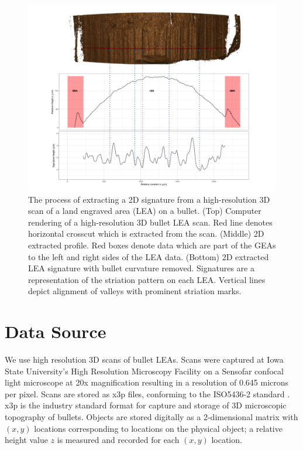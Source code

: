 \documentclass[12pt]{article}
\begin{document}
\begin{figure}
\centering
\includegraphics[width=\textwidth]{../images/process_vertical_png}
\caption{The process of extracting a 2D signature from a high-resolution 3D scan of a land engraved area (LEA) on a bullet. (Top) Computer rendering of a high-resolution 3D bullet LEA scan. Red line denotes horizontal crosscut which is extracted from the scan. (Middle) 2D extracted profile. Red boxes denote data which are part of the GEAs to the left and right sides of the LEA data. (Bottom) 2D extracted LEA signature with bullet curvature removed. Signatures are a representation of the striation pattern on each LEA. Vertical lines depict alignment of valleys with prominent striation marks.}  
\label{processing-process}
\end{figure}

\section{Data Source}

We use high resolution 3D scans of bullet LEAs. Scans were captured at
Iowa State University's High Resolution Microscopy Facility on a
Sensofar confocal light microscope at 20x magnification resulting in a
resolution of 0.645 microns per pixel. Scans are stored as x3p files,
conforming to the ISO5436-2 standard \citep{ISO5436}. x3p is the
industry standard format for capture and storage of 3D microscopic
topography of bullets. Objects are stored digitally as a 2-dimensional
matrix with \((x,y)\) locations corresponding to locations on the
physical object; a relative height value \(z\) is measured and recorded
for each \((x,y)\) location.
\end{document}
